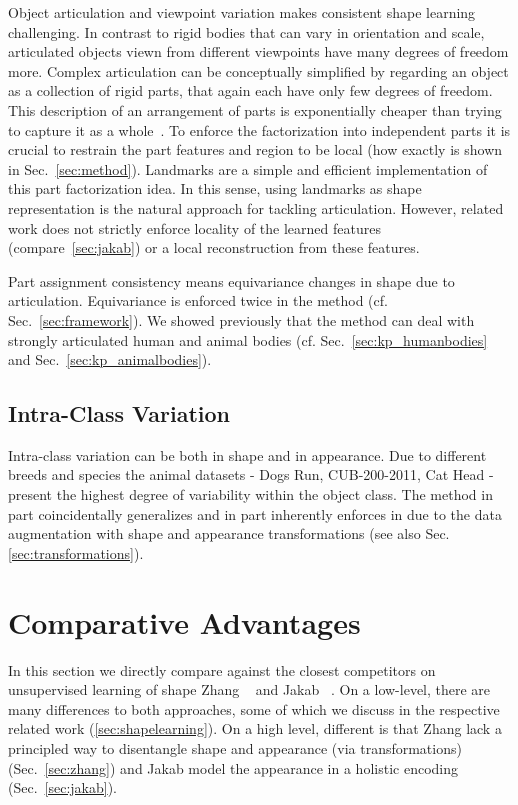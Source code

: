 		Object articulation and viewpoint variation makes consistent shape learning challenging. In contrast to rigid bodies that can vary in orientation and scale, articulated objects viewn from different viewpoints have many degrees of freedom more.
		Complex articulation can be conceptually simplified by regarding an object as a collection of rigid parts, that again each have only few degrees of freedom. This description of an arrangement of parts is exponentially cheaper than trying to capture it as a whole~\cite{ross06parts}. To enforce the factorization into independent parts it is crucial to restrain the part features and region to be local (how exactly is shown in Sec.~\ref{sec:method}). Landmarks are a simple and efficient implementation of this part factorization idea. In this sense, using landmarks as shape representation is the natural approach for tackling articulation. However, related work does not strictly enforce locality of the learned features (compare~\ref{sec:jakab}) or a local reconstruction from these features.


		Part assignment consistency means equivariance \wrt changes in shape due to articulation. Equivariance is enforced twice in the method (cf. Sec.~\ref{sec:framework}).
		We showed previously that the method can deal with strongly articulated human and animal bodies (cf. Sec.~\ref{sec:kp_humanbodies} and Sec.~\ref{sec:kp_animalbodies}).

	\subsection{Intra-Class Variation}\label{sec:intraclass}
		Intra-class variation can be both in shape and in appearance. Due to different breeds and species the animal datasets - Dogs Run, CUB-200-2011, Cat Head - present the highest degree of variability within the object class. The method in part coincidentally generalizes and in part inherently enforces in due to the data augmentation with shape and appearance transformations (see also Sec. \ref{sec:transformations}).

\section{Comparative Advantages}\label{sec:compare}
		In this section we directly compare against the closest competitors on unsupervised learning of shape Zhang \etal~\cite{zhang18} and Jakab \etal~\cite{jakab18}. On a low-level, there are many differences to both approaches, some of which we discuss in the respective related work (\ref{sec:shapelearning}). On a high level, different is that Zhang \etal lack a principled way to disentangle shape and appearance (\eg via transformations) (Sec.~\ref{sec:zhang}) and Jakab \etal model the appearance in a holistic encoding (Sec.~\ref{sec:jakab}).

